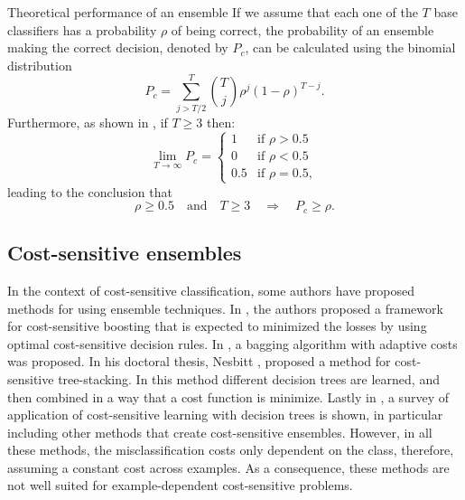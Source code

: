 {  \newpage
  \begin{remark}{Theoretical performance of an ensemble}
  If we assume that each one of the $T$ base classifiers has a probability $\rho$ of 
  being correct, the probability of an ensemble making the correct decision, denoted by $P_c$,
  can be calculated using the binomial \mbox{distribution \citep{Hansen1990}}
  \begin{equation}\label{eq:9:prob}
    P_c = \sum_{j>T/2}^{T} {{T}\choose{j}} \rho^j(1-\rho)^{T-j}.
  \end{equation}
  Furthermore, as shown in \cite{Lam1997}, if $T\ge3$ then:
  \begin{equation}\label{eq:9:Pc}
  \lim_{T \to  \infty} P_c= \begin{cases} 
            1  &\mbox{if } \rho>0.5 \\ 
            0  &\mbox{if } \rho<0.5 \\ 
            0.5  &\mbox{if } \rho=0.5 ,
            \end{cases}
  \end{equation}
	leading to the conclusion that 
	\begin{equation}\label{eq:9:Pc2}
  \rho \ge 0.5 \quad \text{and} \quad T\ge3 \quad \Rightarrow \quad P_c\ge \rho.
  \end{equation}
  \end{remark}
  
\subsection{Cost-sensitive ensembles}

  In the context of cost-sensitive classification, some authors have proposed methods for using 
  ensemble techniques. In \citep{Masnadi-shirazi2011}, the authors proposed a framework for 
  cost-sensitive boosting that is expected to minimized the losses by using optimal cost-sensitive 
  decision rules. In \citep{Street2008}, a bagging algorithm with adaptive costs was proposed. In 
  his doctoral thesis, Nesbitt \citep{Nesbitt2010}, proposed a method for cost-sensitive 
  tree-stacking. In this method different decision trees are learned, and then combined in a way 
  that a cost function is minimize. Lastly in \citep{Lomax2013}, a survey of application of 
  cost-sensitive learning with decision trees is shown, in particular including other methods that 
  create cost-sensitive ensembles. However, in all these methods, the  misclassification costs only 
  dependent on the class, therefore, assuming a constant cost across  examples. As a consequence, 
  these methods are not  well suited for example-dependent cost-sensitive  problems. 

}

